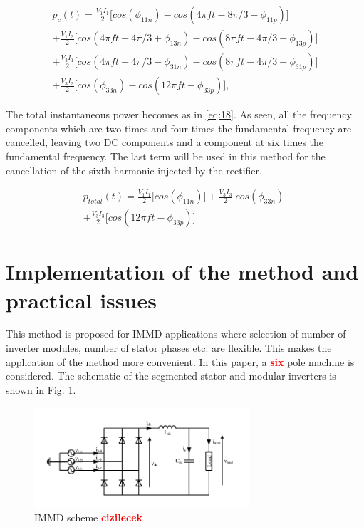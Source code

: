 \documentclass[conference,a4paper,twocolumn]{IEEEtran}
\begin{document}
\begin{equation}
\label{eq:17}
\begin{multlined}
p_c(t) = 
\frac{V_1I_1}{2} \bigg \lbrack cos(\phi_{11n})-cos(4\pi ft-8\pi/3-\phi_{11p}) \bigg \rbrack
\\
+
\frac{V_1I_3}{2} \bigg \lbrack cos(4\pi ft+ 4\pi/3+\phi_{13n})-cos(8\pi ft-4\pi/3-\phi_{13p}) \bigg \rbrack
\\
+
\frac{V_3I_1}{2} \bigg \lbrack cos(4\pi ft+4\pi/3-\phi_{31n})-cos(8\pi ft-4\pi/3-\phi_{31p}) \bigg \rbrack
\\
+
\frac{V_3I_3}{2} \bigg \lbrack cos(\phi_{33n})-cos(12\pi ft-\phi_{33p}) \bigg \rbrack,
\end{multlined}
\end{equation}

The total instantaneous power becomes as in \ref{eq:18}. As seen, all the frequency components which are two times and four times the fundamental frequency are cancelled, leaving two DC components and a component at six times the fundamental frequency. The last term will be used in this method for the cancellation of the sixth harmonic injected by the rectifier.

\begin{equation}
\label{eq:18}
\begin{multlined}
p_{total}(t) = 
\frac{V_1I_1}{2} \bigg \lbrack cos(\phi_{11n}) \bigg \rbrack
+
\frac{V_3I_3}{2} \bigg \lbrack cos(\phi_{33n}) \bigg \rbrack
\\
+
\frac{V_3I_3}{2} \bigg \lbrack cos(12\pi ft-\phi_{33p}) \bigg \rbrack
\end{multlined}
\end{equation}

\section{Implementation of the method and practical issues}

This method is proposed for IMMD applications where selection of number of inverter modules, number of stator phases etc. are flexible. This makes the application of the method more convenient. In this paper, a \textbf{\textcolor{red}{six}} pole machine is considered. The schematic of the segmented stator and modular inverters is shown in Fig. \ref{fig:rect_circuit}. 

\begin{figure}[htp]
  \centering
  \includegraphics[width=8cm]{images/rect_circuit}
  \caption{IMMD scheme  \textbf{\textcolor{red}{cizilecek}}}
  \label{fig:rect_circuit}
\end{figure}
\end{document}

